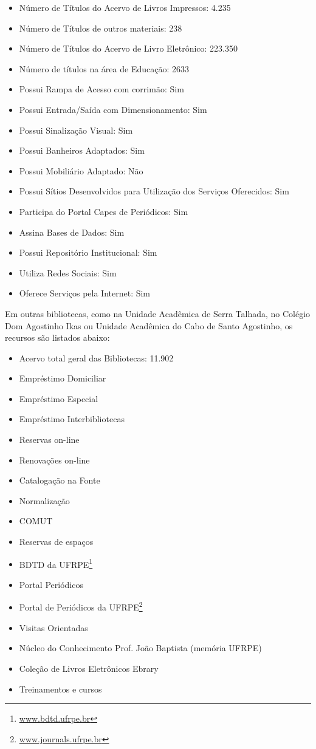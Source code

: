 \documentclass[
	12pt,				%
	openright,			%
  oneside,     %
	a4paper,			%
	chapter=TITLE,		%
	english,			%
	french,				%
	spanish,			%
	brazil				%
	]{abntex2}
\begin{document}
\begin{itemize}
    \item Número de Títulos do Acervo de Livros Impressos: 4.235
    \item Número de Títulos de outros materiais: 238
    \item Número de Títulos do Acervo de Livro Eletrônico: 223.350
    \item Número de títulos na área de Educação: 2633
    \item Possui Rampa de Acesso com corrimão: Sim
    \item Possui Entrada/Saída com Dimensionamento: Sim
    \item Possui Sinalização Visual: Sim
    \item Possui Banheiros Adaptados: Sim
    \item Possui Mobiliário Adaptado: Não
    \item Possui Sítios Desenvolvidos para Utilização dos Serviços Oferecidos: Sim
    \item Participa do Portal Capes de Periódicos: Sim
    \item Assina Bases de Dados: Sim
    \item Possui Repositório Institucional: Sim
    \item Utiliza Redes Sociais: Sim
    \item Oferece Serviços pela Internet: Sim
\end{itemize}

Em outras bibliotecas, como na Unidade Acadêmica de Serra Talhada, no Colégio Dom Agostinho Ikas ou Unidade Acadêmica do Cabo de Santo Agostinho, os recursos são listados abaixo:

\begin{itemize}
    \item Acervo total geral das Bibliotecas: 11.902
    \item Empréstimo Domiciliar
    \item Empréstimo Especial
    \item Empréstimo Interbibliotecas
    \item Reservas on-line
    \item Renovações on-line
    \item Catalogação na Fonte
    \item Normalização
    \item COMUT
    \item Reservas de espaços
    \item BDTD da UFRPE\footnote{\url{www.bdtd.ufrpe.br}}
    \item Portal Periódicos
    \item Portal de Periódicos da UFRPE\footnote{\url{www.journals.ufrpe.br}}
    \item Visitas Orientadas
    \item Núcleo do Conhecimento Prof. João Baptista (memória UFRPE)
    \item Coleção de Livros Eletrônicos Ebrary
    \item Treinamentos e cursos
\end{itemize}
\end{document}
